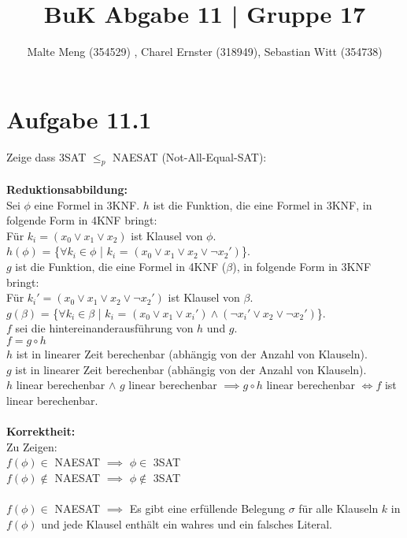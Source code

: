 \documentclass{article}
\title{BuK Abgabe 11 | Gruppe 17}
\author{Malte Meng (354529) , Charel Ernster (318949), Sebastian Witt (354738)}
\begin{document}
	\maketitle 
	\section[a 11.1]{Aufgabe 11.1}
	Zeige dass 3SAT $\leq_p$ NAESAT (Not-All-Equal-SAT):\\\\
	\textbf{Reduktionsabbildung:}\\
	Sei $\phi$ eine Formel in 3KNF.
	$h$ ist die Funktion, die eine Formel in 3KNF, in folgende Form in 4KNF bringt:\\
	Für $k_i = (x_{0} \vee x_{1} \vee x_{2})$ ist Klausel von $\phi$.\\
	$h(\phi)$ = \{$\forall k_i \in \phi$ | $k_i$ = $(x_0 \vee x_1 \vee x_2 \vee \neg x_2')$\}.\\
	$g$ ist die Funktion, die eine Formel in 4KNF ($\beta$), in folgende Form in 3KNF bringt:\\
	Für $k_i' = (x_0 \vee x_1 \vee x_2 \vee \neg x_2')$ ist Klausel von $\beta$.\\
	$g(\beta)$ = \{$\forall k_i \in \beta$ | $k_i$ = 
	$(x_0 \vee x_1 \vee x_i') \wedge (\neg x_i' \vee x_2 \vee \neg x_2')$\}.\\
	$f$ sei die hintereinanderausführung von $h$ und $g$.\\ 
	$f = g \circ h$\\
	$h$ ist in linearer Zeit berechenbar (abhängig von der Anzahl von Klauseln).\\
	$g$ ist in linearer Zeit berechenbar (abhängig von der Anzahl von Klauseln).\\
	$h$ linear berechenbar $\wedge$ $g$ linear berechenbar $\implies g\circ h$ linear berechenbar $\Leftrightarrow f$ ist linear berechenbar.\\\\
	\textbf{Korrektheit:}\\
	Zu Zeigen:\\
	$f(\phi) \in$ NAESAT $\implies$ $\phi \in$ 3SAT\\
	$f(\phi) \notin$ NAESAT $\implies$ $\phi \notin$ 3SAT\\\\
	$f(\phi) \in$ NAESAT $\implies$ Es gibt eine erfüllende Belegung $\sigma$ für alle Klauseln $k$ in $f(\phi)$ und jede Klausel enthält ein wahres und ein falsches Literal. 
	
	
	
\end{document}
